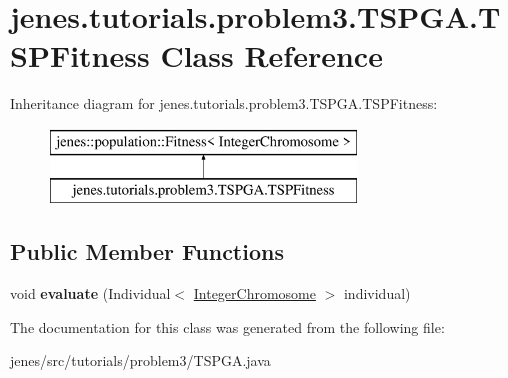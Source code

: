 \hypertarget{classjenes_1_1tutorials_1_1problem3_1_1_t_s_p_g_a_1_1_t_s_p_fitness}{\section{jenes.\-tutorials.\-problem3.\-T\-S\-P\-G\-A.\-T\-S\-P\-Fitness Class Reference}
\label{classjenes_1_1tutorials_1_1problem3_1_1_t_s_p_g_a_1_1_t_s_p_fitness}
}
Inheritance diagram for jenes.\-tutorials.\-problem3.\-T\-S\-P\-G\-A.\-T\-S\-P\-Fitness\-:\begin{figure}[H]
\begin{center}
\leavevmode
\includegraphics[height=2.000000cm]{classjenes_1_1tutorials_1_1problem3_1_1_t_s_p_g_a_1_1_t_s_p_fitness}
\end{center}
\end{figure}
\subsection*{Public Member Functions}
\begin{DoxyCompactItemize}
\item 
\hypertarget{classjenes_1_1tutorials_1_1problem3_1_1_t_s_p_g_a_1_1_t_s_p_fitness_a8f00a10809ec33af08b8cde4d77810a5}{void {\bfseries evaluate} (Individual$<$ \hyperlink{classjenes_1_1chromosome_1_1_integer_chromosome}{Integer\-Chromosome} $>$ individual)}\label{classjenes_1_1tutorials_1_1problem3_1_1_t_s_p_g_a_1_1_t_s_p_fitness_a8f00a10809ec33af08b8cde4d77810a5}

\end{DoxyCompactItemize}


The documentation for this class was generated from the following file\-:\begin{DoxyCompactItemize}
\item 
jenes/src/tutorials/problem3/T\-S\-P\-G\-A.\-java\end{DoxyCompactItemize}
